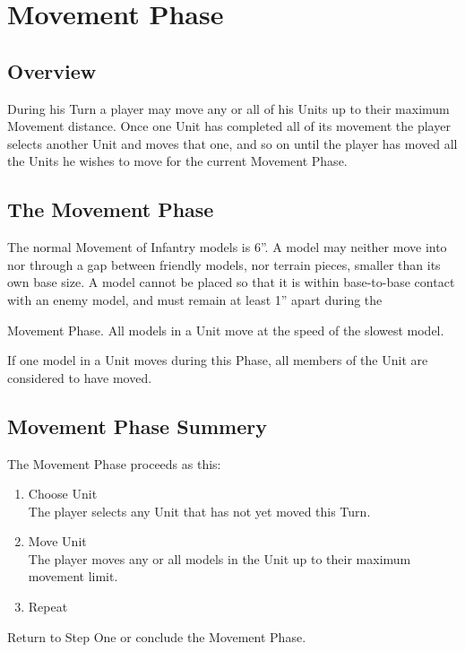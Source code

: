 
\chapter{Movement Phase}

\section{Overview}

During his Turn a player may move any or all of his Units up to
their maximum Movement distance. Once one Unit has completed
all of its movement the player selects another Unit and moves that
one, and so on until the player has moved all the Units he wishes to
move for the current Movement Phase.


\section{The Movement Phase}

The normal Movement of Infantry models is 6”. A model may
neither move into nor through a gap between friendly models, nor
terrain pieces, smaller than its own base size.
A model cannot be placed so that it is within base-to-base contact
with an enemy model, and must remain at least 1” apart during the

Movement Phase. All models in a Unit move at the speed of the
slowest model.

If one model in a Unit moves during this Phase, all members of the
Unit are considered to have moved.

\section{Movement Phase Summery}

The Movement Phase proceeds as this:

\begin{enumerate}
\item  Choose Unit\\
The player selects any Unit that has not yet moved this Turn.
\item Move Unit\\
The player moves any or all models in the Unit up to their
maximum movement limit.
\item Repeat
\end{enumerate}

Return to Step One or conclude the Movement Phase.

